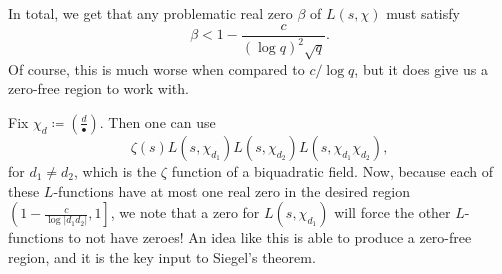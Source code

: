 \documentclass[../notes.tex]{subfiles}
\begin{document}
In total, we get that any problematic real zero $\beta$ of $L(s,\chi)$ must satisfy
\[\beta<1-\frac c{(\log q)^2\sqrt q}.\]
Of course, this is much worse when compared to $c/\log q$, but it does give us a zero-free region to work with.
\begin{remark}[Landau]
	Fix $\chi_d\coloneqq\left(\frac d\bullet\right)$. Then one can use
	\[\zeta(s)L(s,\chi_{d_1})L(s,\chi_{d_2})L(s,\chi_{d_1}\chi_{d_2}),\]
	for $d_1\ne d_2$, which is the $\zeta$ function of a biquadratic field. Now, because each of these $L$-functions have at most one real zero in the desired region $\left(1-\frac c{\log|d_1d_2|},1\right]$, we note that a zero for $L(s,\chi_{d_1})$ will force the other $L$-functions to not have zeroes! An idea like this is able to produce a zero-free region, and it is the key input to Siegel's theorem.
\end{remark}
\end{document}
